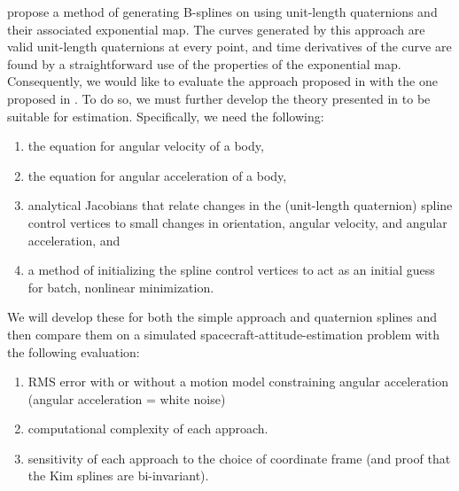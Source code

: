 \documentclass[11pt,a4paper,oneside]{article}
\newcommand{\SOThree}{\text{SO(3) }}
\begin{document}
\citet{Kim9500} propose a method of generating B-splines on \SOThree using unit-length quaternions and their associated exponential map. The curves generated by this approach are valid unit-length quaternions at every point, and time derivatives of the curve are found by a straightforward use of the properties of the exponential map. Consequently, we would like to evaluate the approach proposed in \citet{Furgale1200} with the one proposed in \citet{Kim9500}. To do so, we must further develop the theory presented in \citet{Kim9500} to be suitable for estimation. Specifically, we need the following:
\begin{enumerate}
\item the equation for angular velocity of a body, 
\item the equation for angular acceleration of a body, 
\item analytical Jacobians that relate changes in the (unit-length quaternion) spline control vertices to small changes in orientation, angular velocity, and angular acceleration, and
\item a method of initializing the spline control vertices to act as an initial guess for batch, nonlinear minimization.
\end{enumerate}
We will develop these for both the simple approach and quaternion splines and then compare them on a simulated spacecraft-attitude-estimation problem with the following evaluation:
\begin{enumerate}
\item RMS error with or without a motion model constraining angular acceleration (angular acceleration = white noise)
\item computational complexity of each approach.
\item sensitivity of each approach to the choice of coordinate frame (and proof that the Kim splines are bi-invariant).
\end{enumerate}
\end{document}
